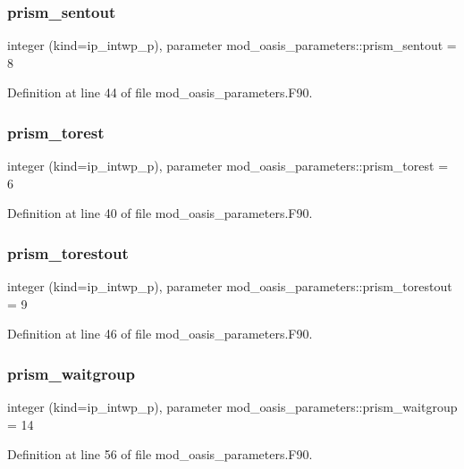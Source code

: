 \subsubsection{\texorpdfstring{prism\+\_\+sentout}{prism\_sentout}}
{\footnotesize\ttfamily integer (kind=ip\+\_\+intwp\+\_\+p), parameter mod\+\_\+oasis\+\_\+parameters\+::prism\+\_\+sentout = 8}



Definition at line 44 of file mod\+\_\+oasis\+\_\+parameters.\+F90.

\mbox{\label{namespacemod__oasis__parameters_a8d037fafc163f46260a8704f92a885a1}} 
\subsubsection{\texorpdfstring{prism\+\_\+torest}{prism\_torest}}
{\footnotesize\ttfamily integer (kind=ip\+\_\+intwp\+\_\+p), parameter mod\+\_\+oasis\+\_\+parameters\+::prism\+\_\+torest = 6}



Definition at line 40 of file mod\+\_\+oasis\+\_\+parameters.\+F90.

\mbox{\label{namespacemod__oasis__parameters_a9ed7a0f0a9392248de5b4b15849843df}} 
\subsubsection{\texorpdfstring{prism\+\_\+torestout}{prism\_torestout}}
{\footnotesize\ttfamily integer (kind=ip\+\_\+intwp\+\_\+p), parameter mod\+\_\+oasis\+\_\+parameters\+::prism\+\_\+torestout = 9}



Definition at line 46 of file mod\+\_\+oasis\+\_\+parameters.\+F90.

\mbox{\label{namespacemod__oasis__parameters_ae5cbdfb558e82bfb8695a8cf425780cb}} 
\subsubsection{\texorpdfstring{prism\+\_\+waitgroup}{prism\_waitgroup}}
{\footnotesize\ttfamily integer (kind=ip\+\_\+intwp\+\_\+p), parameter mod\+\_\+oasis\+\_\+parameters\+::prism\+\_\+waitgroup = 14}



Definition at line 56 of file mod\+\_\+oasis\+\_\+parameters.\+F90.

